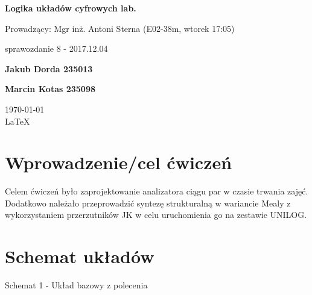 \documentclass[12pt,a4paper]{article}
\begin{document}
	
	\begin{titlepage}
		
		\centering
		{\huge\bfseries Logika układów cyfrowych lab.\par}
		
		\vspace{0.5cm}
		Prowadzący: Mgr inż. Antoni Sterna (E02-38m, wtorek 17:05) \\
	
		\vspace{1.1cm}
		{\Large sprawozdanie 8 - 2017.12.04\par}
		\vfill
		
		{\large\bfseries Jakub Dorda 235013\par}
		{\large\bfseries Marcin Kotas 235098\par}
		
		\vspace{1cm}
		\today \\ \LaTeX
		
		\restoregeometry
	\end{titlepage}


	\section{Wprowadzenie/cel ćwiczeń}
	
		Celem ćwiczeń było zaprojektowanie analizatora ciągu par w czasie trwania zajęć. Dodatkowo należało przeprowadzić syntezę strukturalną  w wariancie Mealy z wykorzystaniem przerzutników JK w celu uruchomienia go na zestawie UNILOG.
		
	\section{Schemat układów}
		
		\begin{center}
			Schemat 1 - Układ bazowy z polecenia
		\end{center}
		
\end{document}
